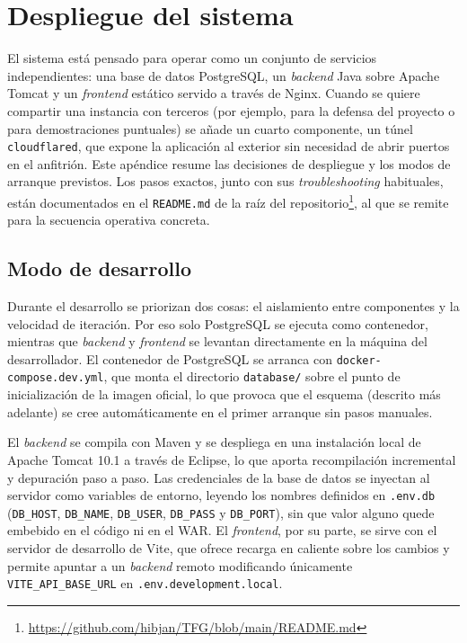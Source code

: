 \chapter{Despliegue del sistema}
\label{Appendix:despliegue}

El sistema está pensado para operar como un conjunto de servicios
independientes: una base de datos PostgreSQL, un \textit{backend} Java sobre
Apache Tomcat y un \textit{frontend} estático servido a través de Nginx. Cuando
se quiere compartir una instancia con terceros (por ejemplo, para la
defensa del proyecto o para demostraciones puntuales) se añade un
cuarto componente, un túnel \texttt{cloudflared}, que expone la
aplicación al exterior sin necesidad de abrir puertos en el anfitrión.
Este apéndice resume las decisiones de despliegue y los modos de
arranque previstos. Los pasos exactos, junto con sus
\emph{troubleshooting} habituales, están documentados en el
\texttt{README.md} de la raíz del repositorio\footnote{\url{https://github.com/hibjan/TFG/blob/main/README.md}},
al que se remite para la secuencia operativa concreta.

\section{Modo de desarrollo}

Durante el desarrollo se priorizan dos cosas: el aislamiento entre
componentes y la velocidad de iteración. Por eso solo PostgreSQL se
ejecuta como contenedor, mientras que \textit{backend} y \textit{frontend} se levantan
directamente en la máquina del desarrollador. El contenedor de
PostgreSQL se arranca con \texttt{docker-compose.dev.yml}, que monta el
directorio \texttt{database/} sobre el punto de inicialización de la
imagen oficial, lo que provoca que el esquema (descrito más adelante)
se cree automáticamente en el primer arranque sin pasos manuales.

El \textit{backend} se compila con Maven y se despliega en una instalación
local de Apache Tomcat 10.1 a través de Eclipse, lo que aporta
recompilación incremental y depuración paso a paso. Las credenciales
de la base de datos se inyectan al servidor como variables de entorno,
leyendo los nombres definidos en \texttt{.env.db}
(\texttt{DB\_HOST}, \texttt{DB\_NAME}, \texttt{DB\_USER},
\texttt{DB\_PASS} y \texttt{DB\_PORT}), sin que valor alguno quede
embebido en el código ni en el WAR. El \textit{frontend}, por su parte, se sirve
con el servidor de desarrollo de Vite, que ofrece recarga en caliente
sobre los cambios y permite apuntar a un \textit{backend} remoto modificando
únicamente \texttt{VITE\_API\_BASE\_URL} en
\texttt{.env.development.local}.

